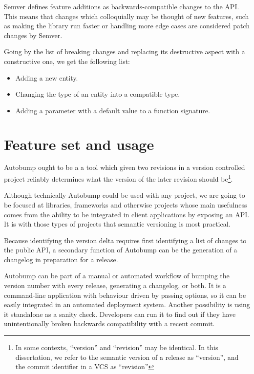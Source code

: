 \documentclass{l4proj}
\begin{document}
Semver defines feature additions as backwards-compatible changes to
the API. This means that changes which colloquially may be thought of
new features, such as making the library run faster or handling more
edge cases are considered patch changes by Semver.

Going by the list of breaking changes and replacing its destructive
aspect with a constructive one, we get the following list:

\begin{itemize}
\item Adding a new entity.
\item Changing the type of an entity into a compatible type.
\item Adding a parameter with a default value to a function signature.
\end{itemize}

\section{Feature set and usage}


Autobump ought to be a a tool which given two revisions in a version
controlled project reliably determines what the version of the later
revision should be\footnote{In some contexts, ``version'' and
``revision'' may be identical. In this dissertation, we refer to the
semantic version of a release as ``version'', and the commit
identifier in a VCS as ``revision''}.

Although technically Autobump could be used with any project, we are
going to be focused at libraries, frameworks and otherwise projects
whose main usefulness comes from the ability to be integrated in
client applications by exposing an API. It is with those types of
projects that semantic versioning is most practical.

Because identifying the version delta requires first identifying a
list of changes to the public API, a secondary function of Autobump
can be the generation of a changelog in preparation for a release.

Autobump can be part of a manual or automated workflow of bumping the
version number with every release, generating a changelog, or both. It
is a command-line application with behaviour driven by passing
options, so it can be easily integrated in an automated deployment
system. Another possibility is using it standalone as a sanity check.
Developers can run it to find out if they have unintentionally broken
backwards compatibility with a recent commit.
\end{document}
